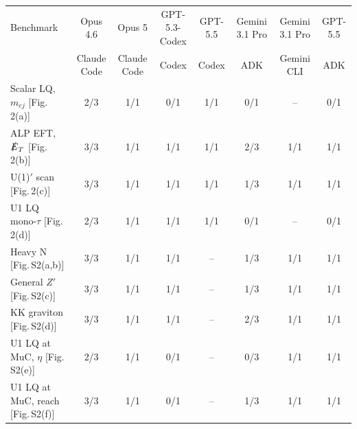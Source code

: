 \begin{tabular}{lccccccc}
\toprule
Benchmark & Opus 4.6 & Opus 5 & GPT-5.3-Codex & GPT-5.5 & Gemini 3.1 Pro & Gemini 3.1 Pro & GPT-5.5 \\
 & Claude Code & Claude Code & Codex & Codex & ADK & Gemini CLI & ADK \\
\midrule
Scalar LQ, $m_{ej}$ [Fig.\,2(a)] & 2/3 & 1/1 & 0/1 & 1/1 & 0/1 & -- & 0/1 \\
ALP EFT, $\slashed{E}_T$ [Fig.\,2(b)] & 3/3 & 1/1 & 1/1 & 1/1 & 2/3 & 1/1 & 1/1 \\
U(1)$'$ scan [Fig.\,2(c)] & 3/3 & 1/1 & 1/1 & 1/1 & 1/3 & 1/1 & 1/1 \\
U1 LQ mono-$\tau$ [Fig.\,2(d)] & 2/3 & 1/1 & 1/1 & 1/1 & 0/1 & -- & 0/1 \\
\midrule
Heavy N [Fig.\,S2(a,b)] & 3/3 & 1/1 & 1/1 & -- & 1/3 & 1/1 & 1/1 \\
General $Z'$ [Fig.\,S2(c)] & 3/3 & 1/1 & 1/1 & -- & 1/3 & 1/1 & 1/1 \\
KK graviton [Fig.\,S2(d)] & 3/3 & 1/1 & 1/1 & -- & 2/3 & 1/1 & 1/1 \\
U1 LQ at MuC, $\eta$ [Fig.\,S2(e)] & 2/3 & 1/1 & 0/1 & -- & 0/3 & 1/1 & 1/1 \\
U1 LQ at MuC, reach [Fig.\,S2(f)] & 3/3 & 1/1 & 0/1 & -- & 1/3 & 1/1 & 1/1 \\
\bottomrule
\end{tabular}
